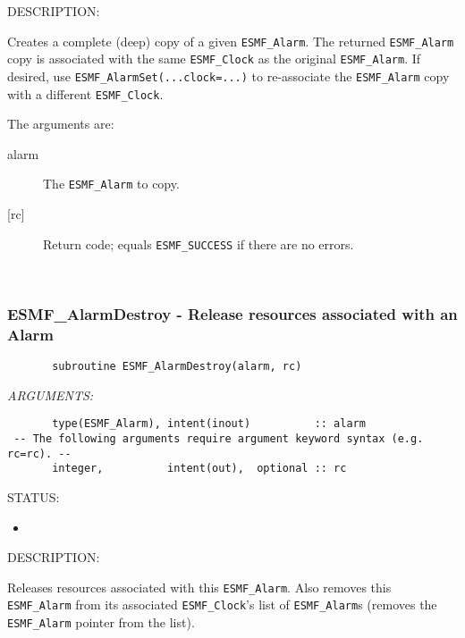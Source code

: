 {\sf DESCRIPTION:\\ }


       Creates a complete (deep) copy of a given {\tt ESMF\_Alarm}.
       The returned {\tt ESMF\_Alarm} copy is associated with the same
       {\tt ESMF\_Clock} as the original {\tt ESMF\_Alarm}.  If desired, use
       {\tt ESMF\_AlarmSet(...clock=...)} to re-associate the
       {\tt ESMF\_Alarm} copy with a different {\tt ESMF\_Clock}.
  
       The arguments are:
       \begin{description}
       \item[alarm]
          The {\tt ESMF\_Alarm} to copy.
       \item[{[rc]}]
          Return code; equals {\tt ESMF\_SUCCESS} if there are no errors.
       \end{description}
   
 
\mbox{}\hrulefill\ 
 
\subsubsection [ESMF\_AlarmDestroy] {ESMF\_AlarmDestroy - Release resources associated with an Alarm}


  
\begin{verbatim}       subroutine ESMF_AlarmDestroy(alarm, rc)\end{verbatim}{\em ARGUMENTS:}
\begin{verbatim}       type(ESMF_Alarm), intent(inout)          :: alarm
 -- The following arguments require argument keyword syntax (e.g. rc=rc). --
       integer,          intent(out),  optional :: rc\end{verbatim}
{\sf STATUS:}
   \begin{itemize}
   \item{}
   \end{itemize}
  
{\sf DESCRIPTION:\\ }


       \begin{sloppypar}
       Releases resources associated with this {\tt ESMF\_Alarm}.  Also
       removes this {\tt ESMF\_Alarm} from its associated {\tt ESMF\_Clock}'s
       list of {\tt ESMF\_Alarm}s (removes the {\tt ESMF\_Alarm} pointer from
       the list).
       \end{sloppypar}
  
